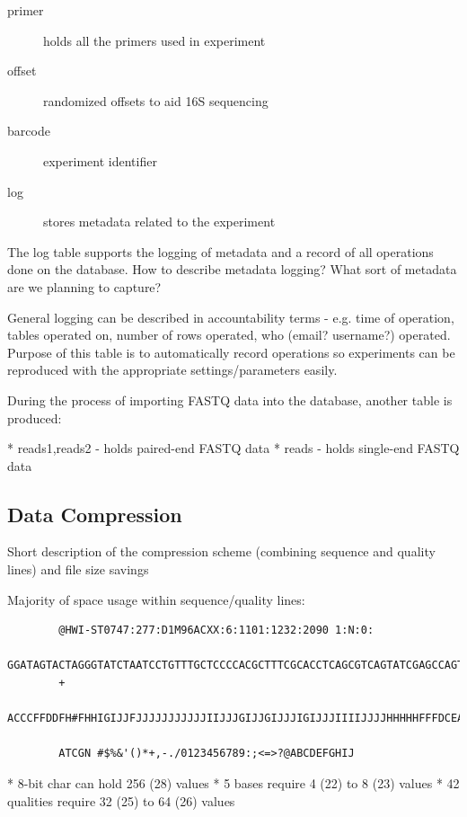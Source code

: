 \documentclass[12pt]{article}
\begin{document}
	\begin{description}
		\item[primer] holds all the primers used in experiment
		\item[offset] randomized offsets to aid 16S sequencing
		\item[barcode] experiment identifier
		\item[log] stores metadata related to the experiment 
	\end{description}
	
	The log table supports the logging of metadata and a record of all operations done on the database.
	How to describe metadata logging? What sort of metadata are we planning to capture?

	General logging can be described in accountability terms - e.g. time of operation, tables operated on,
	number of rows operated, who (email? username?) operated. Purpose of this table
	is to automatically record operations so experiments can be reproduced with the
	appropriate settings/parameters easily.

	During the process of importing FASTQ data into the database, another table is produced:

	* reads1,reads2 - holds paired-end FASTQ data
	* reads - holds single-end FASTQ data

	\subsection{Data Compression} %
	\label{sub:data_compression}
	Short description of the compression scheme (combining sequence and quality lines)
	and file size savings

	Majority of space usage within sequence/quality lines:
	\begin{verbatim}
		@HWI-ST0747:277:D1M96ACXX:6:1101:1232:2090 1:N:0:
		GGATAGTACTAGGGTATCTAATCCTGTTTGCTCCCCACGCTTTCGCACCTCAGCGTCAGTATCGAGCCAGTGAGCCGCCTTCGCCACTGGTGTTCCTCCGAATATCTACGAATTTCACTGCTACACGCGGAATTCCATCCCCCTCTACCGT
		+
		ACCCFFDDFH#FHHIGIJJFJJJJJJJJJJJIIJJJGIJJGIJJJIGIJJJIIIIJJJJHHHHHFFFDCEACCDDCDDD@BDDDDBDDDDDDDDDDDDDBBB@BDEEACDDDDDDDEDDCCDDDADBBDDDDDDDDECCBDDDB@9@AA<<
		
		ATCGN #$%&'()*+,-./0123456789:;<=>?@ABCDEFGHIJ
	\end{verbatim}




	* 8-bit char can hold 256 (28) values
	* 5 bases require 4 (22) to 8 (23) values
	* 42 qualities require 32 (25) to 64 (26) values
\end{document}
